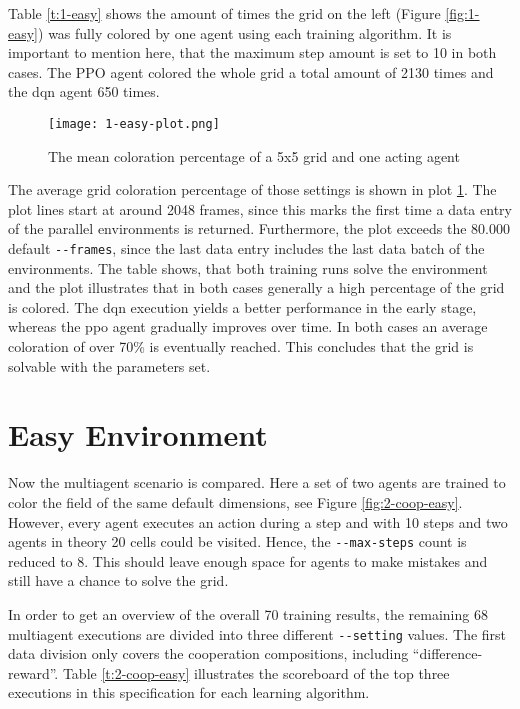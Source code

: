 Table \ref{t:1-easy} shows the amount of times the grid on the left (Figure \ref{fig:1-easy}) was fully colored by one agent using each training algorithm. It is important to mention here, that the maximum step amount is set to 10 in both cases. The PPO agent colored the whole grid a total amount of 2130 times and the dqn agent 650 times.

\begin{figure}[hpbt]
    \centering
    \texttt{[image: 1-easy-plot.png]}\\
    \caption[Mean Coloration Percentage of one Agent in a small environment]{The mean coloration percentage of a 5x5 grid and one acting agent}\label{fig:1-easy-plot}
\end{figure}

The average grid coloration percentage of those settings is shown in plot \ref{fig:1-easy-plot}. The plot lines start at around 2048 frames, since this marks the first time a data entry of the parallel environments is returned. Furthermore, the plot exceeds the 80.000 default \verb|--frames|, since the last data entry includes the last data batch of the environments. The table shows, that both training runs solve the environment and the plot illustrates that in both cases generally a high percentage of the grid is colored. The dqn execution yields a better performance in the early stage, whereas the ppo agent gradually improves over time. In both cases an average coloration of over 70\% is eventually reached. This concludes that the grid is solvable with the parameters set.

\section{Easy Environment} \label{easy_env}

Now the multiagent scenario is compared. Here a set of two agents are trained to color the field of the same default dimensions, see Figure \ref{fig:2-coop-easy}. However, every agent executes an action during a step and with 10 steps and two agents in theory 20 cells could be visited. Hence, the \verb|--max-steps| count is reduced to 8. This should leave enough space for agents to make mistakes and still have a chance to solve the grid.

In order to get an overview of the overall 70 training results, the remaining 68 multiagent executions are divided into three different \verb|--setting| values. The first data division only covers the cooperation compositions, including ``difference-reward''. Table \ref{t:2-coop-easy} illustrates the scoreboard of the top three executions in this specification for each learning algorithm. \\\\

